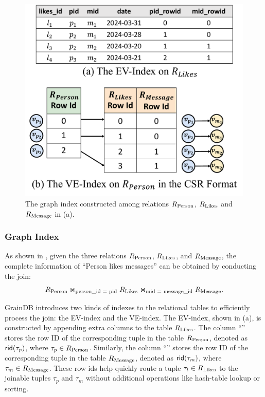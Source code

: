 \begin{figure}[t]
    \centering
    \includegraphics[width=.72\linewidth]{./figures/graph-index-likes.pdf}
    \caption{The graph index constructed among relations ${R_{\text{Person}}}$, ${R_{\text{Likes}}}$
    and ${R_{\text{Message}}}$ in (a).}
    \label{fig:graph-index}
\end{figure}

\subsubsection{Graph Index}
\label{sec:graph-index}

As shown in , given the three relations ${R_{\text{Person}}}$, ${R_{\text{Likes}}}$, and ${R_{\text{Message}}}$, the complete information of ``Person likes messages'' can be obtained by conducting the join:
\[ {R_{\text{Person}}} \Join_\text{person\_id = pid} {\ensuremath R_{\text{Likes}}} \Join_\text{mid = message\_id} {\ensuremath R_{\text{Message}}}. \]

\enlargethispage{1em}

GrainDB introduces two kinds of indexes to the relational tables to efficiently process the join: the EV-index and the VE-index. The EV-index, shown in (a), is constructed by appending extra columns to the table ${R_{\text{Likes}}}$. The column ``'' stores the row ID of the corresponding tuple in the table ${R_{\text{Person}}}$, denoted as ${\mathsf{rid}}(\tau_{p})$, where $\tau_{p} \in {\ensuremath R_{\text{Person}}}$. Similarly, the column ``'' stores the row ID of the corresponding tuple in the table ${R_{\text{Message}}}$, denoted as ${\mathsf{rid}}(\tau_{m})$, where $\tau_{m} \in {\ensuremath R_{\text{Message}}}$. These row ids help quickly route a tuple $\tau_{l} \in {\ensuremath R_{\text{Likes}}}$ to the joinable tuples $\tau_{p}$ and $\tau_{m}$ without additional operations like hash-table lookup or sorting.

